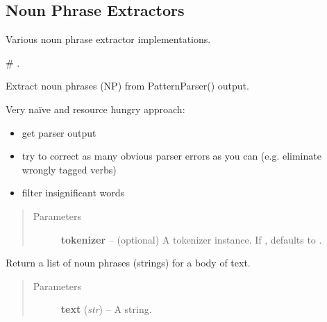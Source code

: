 \documentclass[letterpaper,10pt,english]{sphinxmanual}
\begin{document}
\subsection{Noun Phrase Extractors}
\label{api_reference:module-textblob_de.np_extractors}\label{api_reference:noun-phrase-extractors}
Various noun phrase extractor implementations.

\# {\hyperref[api_reference:textblob_de.np_extractors.PatternParserNPExtractor]{}}.

\begin{fulllineitems}
\label{api_reference:textblob_de.np_extractors.PatternParserNPExtractor}
Extract noun phrases (NP) from PatternParser() output.

Very naïve and resource hungry approach:
\begin{itemize}
\item {} 
get parser output

\item {} 
try to correct as many obvious parser errors as you can (e.g. eliminate wrongly tagged verbs)

\item {} 
filter insignificant words

\end{itemize}
\begin{quote}\begin{description}
\item[{Parameters}] \leavevmode
\textbf{tokenizer} -- (optional) A tokenizer instance. If , defaults to
{\hyperref[api_reference:textblob_de.tokenizers.PatternTokenizer]{}}.

\end{description}\end{quote}

\begin{fulllineitems}
\label{api_reference:textblob_de.np_extractors.PatternParserNPExtractor.extract}
Return a list of noun phrases (strings) for a body of text.
\begin{quote}\begin{description}
\item[{Parameters}] \leavevmode
\textbf{text} (\emph{str}) -- A string.

\end{description}\end{quote}

\end{fulllineitems}


\end{fulllineitems}
\end{document}
